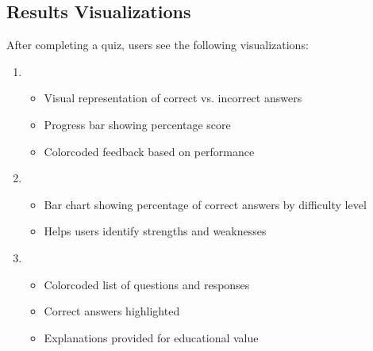 \documentclass[letterpaper,10pt,english]{sphinxmanual}
\begin{document}
\subsection{Results Visualizations}
\label{\detokenize{analytics:results-visualizations}}
\sphinxAtStartPar
After completing a quiz, users see the following visualizations:
\begin{enumerate}
%
\item {} 
\sphinxAtStartPar
{}
\begin{itemize}
\item {} 
\sphinxAtStartPar
Visual representation of correct vs. incorrect answers

\item {} 
\sphinxAtStartPar
Progress bar showing percentage score

\item {} 
\sphinxAtStartPar
Color\sphinxhyphen{}coded feedback based on performance

\end{itemize}

\item {} 
\sphinxAtStartPar
{}
\begin{itemize}
\item {} 
\sphinxAtStartPar
Bar chart showing percentage of correct answers by difficulty level

\item {} 
\sphinxAtStartPar
Helps users identify strengths and weaknesses

\end{itemize}

\item {} 
\sphinxAtStartPar
{}
\begin{itemize}
\item {} 
\sphinxAtStartPar
Color\sphinxhyphen{}coded list of questions and responses

\item {} 
\sphinxAtStartPar
Correct answers highlighted

\item {} 
\sphinxAtStartPar
Explanations provided for educational value

\end{itemize}

\end{enumerate}
\end{document}
